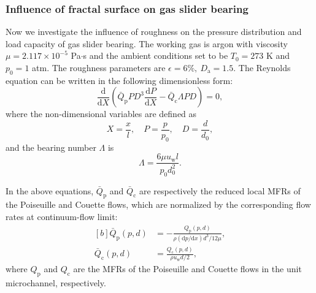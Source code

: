 \subsubsection{Influence of fractal surface on gas slider bearing}\label{sec:bearing}

Now we investigate the influence of roughness on the pressure distribution and load capacity of gas slider bearing. The working gas is argon with viscosity $\mu=2.117\times10^{-5}$ Pa$\cdot$s and the ambient conditions set to be $T_0=273$ K and $p_0=1$ atm. The roughness parameters are $\epsilon=6\%,\ D_\text{a}=1.5$. The Reynolds equation can be written in the following dimensionless form:
\begin{equation}\label{Reynolds}
\frac{\mathrm{d}}{\mathrm{d}X}\left(\bar{Q}_\mathrm{p}PD^3\frac{\mathrm{d}P}{\mathrm{d}X}-\bar{Q}_\text{c}\Lambda PD\right)=0,
\end{equation}
where the non-dimensional variables are defined as
\begin{equation}
X=\frac{x}{l},\quad P=\frac{p}{p_0}, \quad D=\frac{d}{d_0},
\end{equation}
and the bearing number $\Lambda$ is
\begin{equation}
\Lambda=\frac{6\mu u_\mathrm{w}l}{p_0d^2_0}.
\label{BearingNum}
\end{equation}

In the above equations, $\bar{Q}_\text{p}$ and $\bar{Q}_\text{c}$ are respectively the reduced local MFRs of the Poiseuille and Couette flows, which are normalized by the corresponding flow rates at continuum-flow limit:
\begin{equation}\label{NormQp}
\begin{aligned}[b]
\bar{Q}_\text{p}(p,d)&=-\frac{Q_\text{p}(p,d)}{\rho(\mathrm{d}p/\mathrm{d}x)d^3/12\mu},\\
\bar{Q}_\text{c}(p,d)&=\frac{Q_\text{c}(p,d)}{\rho u_\text{w}d/2},
\end{aligned}
\end{equation}
where $Q_\text{p}$ and $Q_\text{c}$ are the MFRs of the Poiseuille and Couette flows in the unit microchannel, respectively. 

